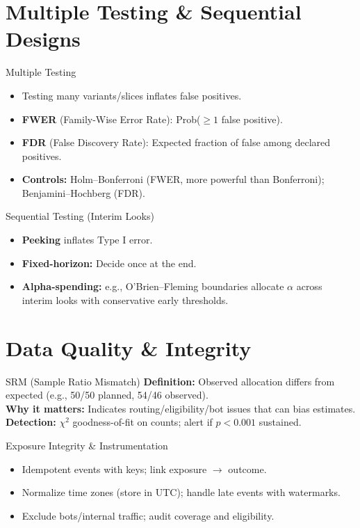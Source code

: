 \documentclass[aspectratio=169]{beamer}
\begin{document}
\section{Multiple Testing \& Sequential Designs}
\begin{frame}{Multiple Testing}
  \begin{itemize}
    \item Testing many variants/slices inflates false positives.
    \item \textbf{FWER} (Family-Wise Error Rate): Prob($\geq1$ false positive).
    \item \textbf{FDR} (False Discovery Rate): Expected fraction of false among declared positives.
    \item \textbf{Controls:} Holm--Bonferroni (FWER, more powerful than Bonferroni); Benjamini--Hochberg (FDR).
  \end{itemize}
\end{frame}

\begin{frame}{Sequential Testing (Interim Looks)}
  \begin{itemize}
    \item \textbf{Peeking} inflates Type I error.
    \item \textbf{Fixed-horizon:} Decide once at the end.
    \item \textbf{Alpha-spending:} e.g., O'Brien--Fleming boundaries allocate $\alpha$ across interim looks with conservative early thresholds.
  \end{itemize}
\end{frame}

\section{Data Quality \& Integrity}
\begin{frame}{SRM (Sample Ratio Mismatch)}
  \textbf{Definition:} Observed allocation differs from expected (e.g., 50/50 planned, 54/46 observed).\\[0.5em]
  \textbf{Why it matters:} Indicates routing/eligibility/bot issues that can bias estimates.\\[0.5em]
  \textbf{Detection:} $\chi^2$ goodness-of-fit on counts; alert if $p < 0.001$ sustained.
\end{frame}

\begin{frame}{Exposure Integrity \& Instrumentation}
  \begin{itemize}
    \item Idempotent events with keys; link exposure $\rightarrow$ outcome.
    \item Normalize time zones (store in UTC); handle late events with watermarks.
    \item Exclude bots/internal traffic; audit coverage and eligibility.
  \end{itemize}
\end{frame}
\end{document}
